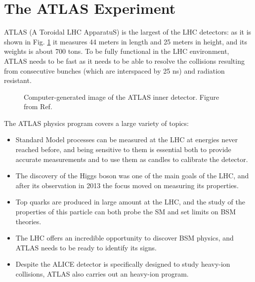 
\section{The ATLAS Experiment}
\label{sed:cern:atlas}

ATLAS (A Toroidal LHC ApparatuS)\cite{atlas:atlas} is the largest of the LHC detectors: as it is shown in Fig. \ref{fig:atlas:atlas} it measures 44 meters in length and 25 meters in height, and its weights is about 700 tons. To be fully functional in the LHC environment,  ATLAS needs to be fast as it needs to be able to resolve the collisions resulting from consecutive bunches (which are interspaced by 25 ns) and radiation resistant. 

\begin{figure}[ht]
\centering
{}
\caption{Computer-generated image of the ATLAS inner detector. Figure from Ref. \cite{atlas:atlas}}
\label{fig:atlas:atlas}
\end{figure}

The ATLAS physics program covers a large variety of topics: 
\begin{itemize}
\item Standard Model processes can be measured at the LHC at energies never reached before, and being sensitive to them is essential both to provide accurate measurements and to use them as candles to calibrate the detector. 
\item The discovery of the Higgs boson was one of the main goals of the LHC, and after its observation in 2013 the focus moved on measuring its properties. 
\item Top quarks are produced in large amount at the LHC, and the study of the properties of this particle can both probe the SM and set limits on BSM theories.
\item The LHC offers an incredible opportunity to discover BSM physics, and ATLAS needs to be ready to identify its signs.
\item Despite the ALICE detector is specifically designed to study heavy-ion collisions, ATLAS also carries out an heavy-ion program.
\end{itemize}

